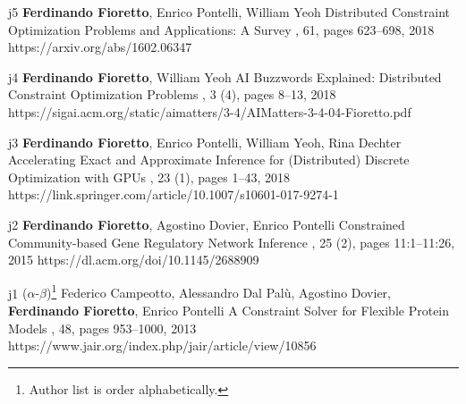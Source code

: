 \begin{pubs}
	\journalentry
	{j5}	%
		{{\bf Ferdinando Fioretto}, Enrico Pontelli, William Yeoh}
		{Distributed Constraint Optimization Problems and Applications: A Survey}
		{\JAIR, 61, pages 623--698, 2018} 
		{https://arxiv.org/abs/1602.06347}

	\journalentry 
	{j4}	%
		{{\bf Ferdinando Fioretto}, William Yeoh}
		{AI Buzzwords Explained: Distributed Constraint Optimization Problems}
		{, 3 (4), pages 8--13, 2018}
		{https://sigai.acm.org/static/aimatters/3-4/AIMatters-3-4-04-Fioretto.pdf}

	\journalentry 
	{j3}	%
		{{\bf Ferdinando Fioretto}, Enrico Pontelli, William Yeoh, Rina Dechter}
		{Accelerating Exact and Approximate Inference for (Distributed) Discrete Optimization with GPUs}
		{, 23 (1), pages 1--43, 2018}
		{https://link.springer.com/article/10.1007/s10601-017-9274-1}

	\journalentry 
	{j2}	%
		{{\bf Ferdinando Fioretto}, Agostino Dovier, Enrico Pontelli}
		{Constrained Community-based Gene Regulatory Network Inference}
		{, 25 (2), pages 11:1--11:26, 2015}
		{https://dl.acm.org/doi/10.1145/2688909}

	\journalentry
	{j1}	%
		{($\alpha$-$\beta$)\footnote{Author list is order alphabetically.} 
			Federico Campeotto, Alessandro Dal Pal\`{u}, Agostino Dovier,  {\bf Ferdinando Fioretto}, Enrico Pontelli}
		{A Constraint Solver for Flexible Protein Models}
		{\JAIR, 48, pages 953--1000, 2013}
		{https://www.jair.org/index.php/jair/article/view/10856}
\end{pubs}


